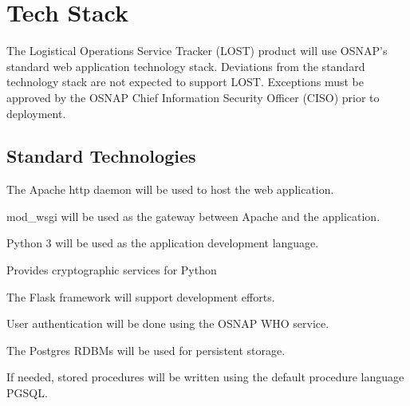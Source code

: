 \chapter*{Tech Stack}
The Logistical Operations Service Tracker (LOST) product will use OSNAP's standard web application technology stack. Deviations from the standard technology stack are not expected to support LOST. Exceptions must be approved by the OSNAP Chief Information Security Officer (CISO) prior to deployment. 

\section*{Standard Technologies}
\begin{description}[align=right,labelwidth=3cm]
\item[Apache httpd] The Apache http daemon will be used to host the web application.
\item[mod\_wsgi] mod\_wsgi will be used as the gateway between Apache and the application.
\item[Python] Python 3 will be used as the application development language.
\item[PyCryptodom] Provides cryptographic services for Python
\item[Flask] The Flask framework will support development efforts.
\item[WHO] User authentication will be done using the OSNAP WHO service.
\item[Postgres] The Postgres RDBMs will be used for persistent storage.
\item[PGSQL] If needed, stored procedures will be written using the default procedure language PGSQL.
\end{description}




